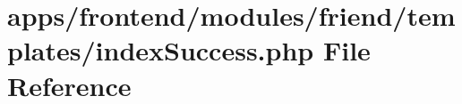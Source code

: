 \hypertarget{frontend_2modules_2friend_2templates_2index_success_8php}{\section{apps/frontend/modules/friend/templates/index\-Success.php File Reference}
\label{frontend_2modules_2friend_2templates_2index_success_8php}
}
